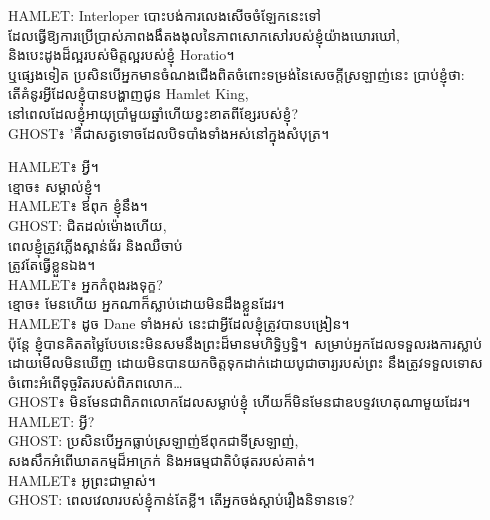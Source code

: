 \begin{playdialog}%
HAMLET: Interloper បោះបង់ការលេងសើចចំឡែកនេះទៅ\\
ដែលធ្វើឱ្យការប្រើប្រាស់ភាពងងឹតងងុលនៃភាពសោកសៅរបស់ខ្ញុំយ៉ាងឃោរឃៅ,\\
និងបេះដូងដ៏ល្អរបស់មិត្តល្អរបស់ខ្ញុំ Horatio។\\
ឬផ្សេងទៀត ប្រសិនបើអ្នកមានចំណងជើងពិតចំពោះទម្រង់នៃសេចក្តីស្រឡាញ់នេះ ប្រាប់ខ្ញុំថា:\\
តើគំនូរអ្វីដែលខ្ញុំបានបង្ហាញជូន Hamlet King,\\
នៅពេលដែលខ្ញុំអាយុប្រាំមួយឆ្នាំហើយខ្វះខាតពីខ្សែរបស់ខ្ញុំ?\\

GHOST៖ 'គឺជាសត្វទោចដែលបិទបាំងទាំងអស់នៅក្នុងសំបុត្រ។\

HAMLET៖ អ្វី។\\

ខ្មោច៖ សម្គាល់ខ្ញុំ។\\

HAMLET៖ ឪពុក ខ្ញុំនឹង។\\

GHOST: ជិតដល់ម៉ោងហើយ,\\
ពេលខ្ញុំត្រូវភ្លើងស្ពាន់ធ័រ និងឈឺចាប់\\
ត្រូវតែធ្វើខ្លួនឯង។\\

HAMLET៖ អ្នក​កំពុង​រង​ទុក្ខ?\\

ខ្មោច៖ មែនហើយ អ្នកណាក៏ស្លាប់ដោយមិនដឹងខ្លួនដែរ។\\

HAMLET៖ ដូច Dane ទាំងអស់ នេះជាអ្វីដែលខ្ញុំត្រូវបានបង្រៀន។\\
ប៉ុន្តែ ខ្ញុំបានគិតតម្លៃបែបនេះមិនសមនឹងព្រះដ៏មានមហិទ្ធិឫទ្ធិ។\
សម្រាប់​អ្នក​ដែល​ទទួល​រង​ការ​ស្លាប់​ដោយ​មើល​មិន​ឃើញ
ដោយ​មិន​បាន​យក​ចិត្ត​ទុក​ដាក់​ដោយ​បូជាចារ្យ​របស់​ព្រះ
នឹងត្រូវទទួលទោសចំពោះអំពើទុច្ចរិតរបស់ពិភពលោក…\\

GHOST៖ មិនមែនជាពិភពលោកដែលសម្លាប់ខ្ញុំ ហើយក៏មិនមែនជាឧបទ្ទវហេតុណាមួយដែរ។\\

HAMLET: អ្វី?\\

GHOST: ប្រសិនបើអ្នកធ្លាប់ស្រឡាញ់ឪពុកជាទីស្រឡាញ់,\\
សងសឹក​អំពើ​ឃាតកម្ម​ដ៏​អាក្រក់ និង​អធម្មជាតិ​បំផុត​របស់​គាត់។\\

HAMLET៖ អូព្រះជាម្ចាស់។\\

GHOST: ពេលវេលារបស់ខ្ញុំកាន់តែខ្លី។ តើអ្នកចង់ស្តាប់រឿងនិទានទេ?


\end{playdialog}
